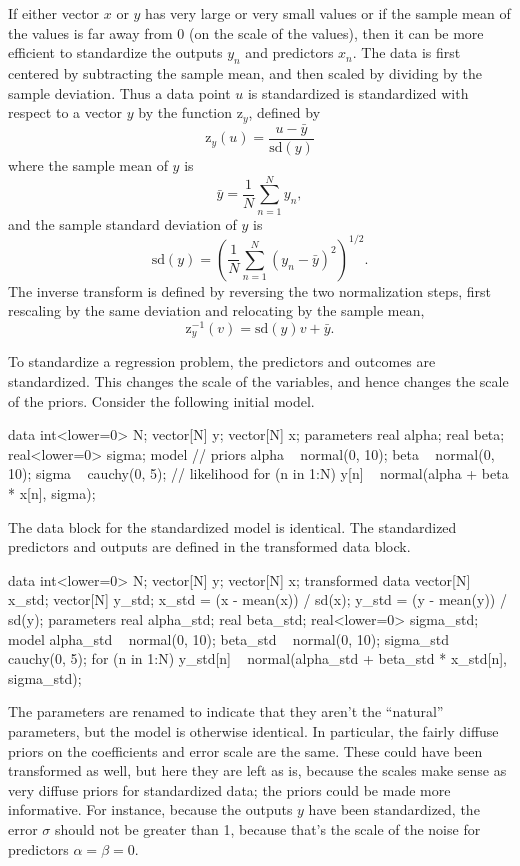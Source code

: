 If either vector $x$ or $y$ has very large or very small values or if the
sample mean of the values is far away from 0 (on the scale of the values),
then it can be more efficient to standardize the outputs $y_n$ and
predictors $x_n$.  The data is first centered by subtracting the
sample mean, and then scaled by dividing by the sample deviation.
Thus a data point $u$ is standardized is standardized with respect to
a vector $y$  by the function $\mbox{z}_y$, defined by
\[
\mbox{z}_y(u) = \frac{u - \bar{y}}{\mbox{sd}(y)}
\]
where the sample mean of $y$ is
\[
\bar{y}
= \frac{1}{N} \sum_{n=1}^N y_n,
\]
and the sample standard deviation of $y$ is
\[
\mbox{sd}(y) 
= \left( 
\frac{1}{N} \sum_{n=1}^N (y_n - \bar{y})^2
\right)^{1/2}.
\]
The inverse transform is
defined by reversing the two normalization steps, first rescaling by
the same deviation and relocating by the sample mean,
\[
\mbox{z}_y^{-1}(v) = \mbox{sd}(y) v + \bar{y}.
\]

To standardize a regression problem, the predictors and outcomes are
standardized.  This changes the scale of the variables, and hence
changes the scale of the priors.  Consider the following initial
model.
%
\begin{stancode}
data {
  int<lower=0> N;
  vector[N] y;
  vector[N] x;
}
parameters {
  real alpha;
  real beta;
  real<lower=0> sigma;
}
model {
  // priors
  alpha ~ normal(0, 10);    
  beta ~ normal(0, 10);
  sigma ~ cauchy(0, 5);
  // likelihood
  for (n in 1:N)
    y[n] ~ normal(alpha + beta * x[n], sigma);
}
\end{stancode}
%

The data block for the standardized model is identical.  The
standardized predictors and outputs are defined in the transformed
data block.  
%
\begin{stancode}
data {
  int<lower=0> N;
  vector[N] y;
  vector[N] x;
}
transformed data {
  vector[N] x_std;
  vector[N] y_std;
  x_std = (x - mean(x)) / sd(x);
  y_std = (y - mean(y)) / sd(y);
}
parameters {
  real alpha_std;
  real beta_std;
  real<lower=0> sigma_std;
}
model {
  alpha_std ~ normal(0, 10);    
  beta_std ~ normal(0, 10);
  sigma_std ~ cauchy(0, 5);
  for (n in 1:N)
    y_std[n] ~ normal(alpha_std + beta_std * x_std[n], 
                      sigma_std);
}
\end{stancode}
%
The parameters are renamed to indicate that they aren't the
``natural'' parameters, but the model is otherwise identical.  In
particular, the fairly diffuse priors on the coefficients and error
scale are the same.  These could have been transformed as well, but
here they are left as is, because the scales make sense as very
diffuse priors for standardized data; the priors could be made more
informative.  For instance, because the outputs $y$ have been
standardized, the error $\sigma$ should not be greater than 1, because
that's the scale of the noise for predictors $\alpha = \beta = 0$.


